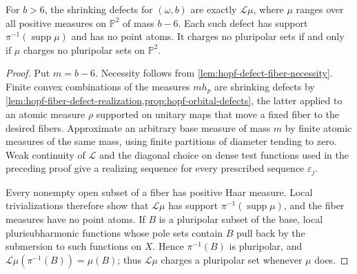 \begin{theorem}\label{thm:hopf-standard-defect-classification}
For $b>6$, the shrinking defects for $(\omega,b)$ are exactly $\mathcal L\mu$, where $\mu$ ranges over all positive measures on $\mathbb P^2$ of mass $b-6$. Each such defect has support $\pi^{-1}(\operatorname{supp}\mu)$ and has no point atoms. It charges no pluripolar sets if and only if $\mu$ charges no pluripolar sets on $\mathbb P^2$.
\end{theorem}
\begin{proof}
Put $m=b-6$. Necessity follows from \cref{lem:hopf-defect-fiber-necessity}. Finite convex combinations of the measures $mh_p$ are shrinking defects by \cref{lem:hopf-fiber-defect-realization,prop:hopf-orbital-defects}, the latter applied to an atomic measure $\rho$ supported on unitary maps that move a fixed fiber to the desired fibers. Approximate an arbitrary base measure of mass $m$ by finite atomic measures of the same mass, using finite partitions of diameter tending to zero. Weak continuity of $\mathcal L$ and the diagonal choice on dense test functions used in the preceding proof give a realizing sequence for every prescribed sequence $\varepsilon_j$.

Every nonempty open subset of a fiber has positive Haar measure. Local trivializations therefore show that $\mathcal L\mu$ has support $\pi^{-1}(\operatorname{supp}\mu)$, and the fiber measures have no point atoms. If $B$ is a pluripolar subset of the base, local plurisubharmonic functions whose pole sets contain $B$ pull back by the submersion to such functions on $X$. Hence $\pi^{-1}(B)$ is pluripolar, and $\mathcal L\mu(\pi^{-1}(B))=\mu(B)$; thus $\mathcal L\mu$ charges a pluripolar set whenever $\mu$ does.


\end{proof}
